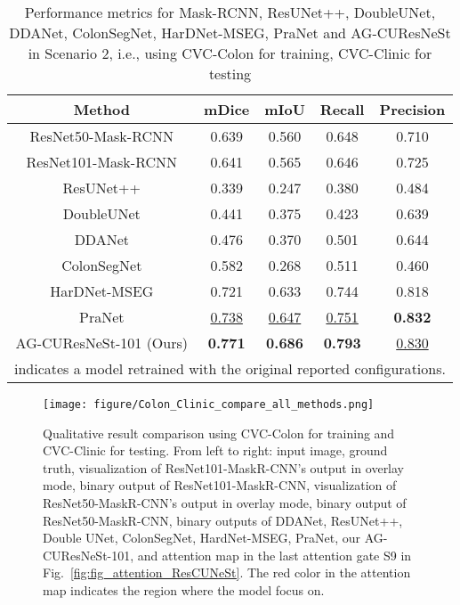 \documentclass[review, sort&compress]{elsarticle}
\begin{document}
\begin{table}[ht!]
\centering
\caption{Performance metrics for Mask-RCNN, ResUNet++, DoubleUNet, DDANet, ColonSegNet, HarDNet-MSEG, PraNet and AG-CUResNeSt in Scenario 2, i.e., using CVC-Colon for training, CVC-Clinic for testing}
\begin{tabular}{ c|c c c c}
\hline
Method & mDice  & mIoU  & Recall  & Precision   \\
\hline
\hline
ResNet50-Mask-RCNN \cite{qadir2019polyp}   & 0.639    & 0.560        & 0.648  & 0.710      \\
ResNet101-Mask-RCNN \cite{qadir2019polyp}  & 0.641 & 0.565        & 0.646  & 0.725      \\

ResUNet++ \cite{jha2019resunet++}  & 0.339 & 0.247 & 0.380 & 0.484 \\

DoubleUNet \cite{jha2020doubleu}  & 0.441 &  0.375 & 0.423 & 0.639 \\

DDANet \cite{tomar2020ddanet}  & 0.476 & 0.370 & 0.501 & 0.644 \\

ColonSegNet \cite{jha2021real}  & 0.582 &    0.268 & 0.511 & 0.460 \\

HarDNet-MSEG \cite{huang2021hardnet}  & 0.721 &  0.633 & 0.744 & 0.818 \\

PraNet \cite{fan2020pranet}  & \underline{0.738} &   \underline{0.647} & \underline{0.751} & \textbf{0.832} \\
\hline
\hline
AG-CUResNeSt-101 (Ours)   & \textbf{0.771}    & \textbf{0.686}        & \textbf{0.793}  & \underline{0.830}  \\
\hline
\multicolumn{5}{l}{ indicates a model retrained with the original reported configurations.
}
\end{tabular}
\label{tab_colon_clinic}
\end{table}

\begin{figure*}[ht!]
\centering
\texttt{[image: figure/Colon\_Clinic\_compare\_all\_methods.png]}
\caption{Qualitative result comparison using CVC-Colon for training and CVC-Clinic for testing. From left to right: input image, ground truth, visualization of ResNet101-MaskR-CNN's output in overlay mode, binary output of ResNet101-MaskR-CNN, visualization of ResNet50-MaskR-CNN's output in overlay mode, binary output of ResNet50-MaskR-CNN, binary outputs of DDANet, ResUNet++, Double UNet, ColonSegNet, HardNet-MSEG, PraNet, our AG-CUResNeSt-101, and attention map in the last attention gate S9 in Fig.~\ref{fig:fig_attention_ResCUNeSt}. The red color in the attention map indicates the region where the model focus on.}
\label{fig_colon_clinic}
\end{figure*}
\end{document}
